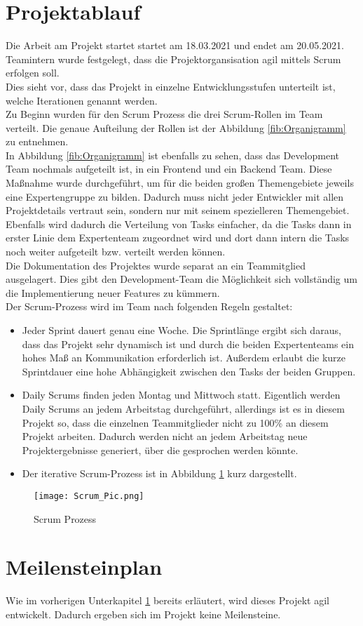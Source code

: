 \section{Projektablauf}
\label{sec:ablauf}
Die Arbeit am Projekt startet startet am 18.03.2021 und endet am 20.05.2021. \\
Teamintern wurde festgelegt, dass die Projektorgansisation agil mittels Scrum erfolgen soll.\\
Dies sieht vor, dass das Projekt in einzelne Entwicklungsstufen unterteilt ist, welche Iterationen genannt werden.\\
Zu Beginn wurden für den Scrum Prozess die drei Scrum-Rollen im Team verteilt. Die genaue Aufteilung der Rollen ist der Abbildung \ref{fib:Organigramm} zu entnehmen. \\
In Abbildung \ref{fib:Organigramm} ist ebenfalls zu sehen, dass das Development Team nochmals aufgeteilt ist, in ein Frontend und ein Backend Team. Diese Maßnahme wurde durchgeführt, um für die beiden großen Themengebiete jeweils eine Expertengruppe zu bilden. Dadurch muss nicht jeder Entwickler mit allen Projektdetails vertraut sein, sondern nur mit seinem spezielleren Themengebiet. Ebenfalls wird dadurch die Verteilung von Tasks einfacher, da die Tasks dann in erster Linie dem Expertenteam zugeordnet wird und dort dann intern die Tasks noch weiter aufgeteilt bzw. verteilt werden können. \\
Die Dokumentation des Projektes wurde separat an ein Teammitglied ausgelagert. Dies gibt den Development-Team die Möglichkeit sich vollständig um die Implementierung neuer Features zu kümmern.\\
Der Scrum-Prozess wird im Team nach folgenden Regeln gestaltet:
\begin{itemize}
\item Jeder Sprint dauert genau eine Woche. Die Sprintlänge ergibt sich daraus, dass das Projekt sehr dynamisch ist und durch die beiden Expertenteams ein hohes Maß an Kommunikation erforderlich ist. Außerdem erlaubt die kurze Sprintdauer eine hohe Abhängigkeit zwischen den Tasks der beiden Gruppen.
\item Daily Scrums finden jeden Montag und Mittwoch statt. Eigentlich werden Daily Scrums an jedem Arbeitstag durchgeführt, allerdings ist es in diesem Projekt so, dass die einzelnen Teammitglieder nicht zu 100\% an diesem Projekt arbeiten. Dadurch werden nicht an jedem Arbeitstag neue Projektergebnisse generiert, über die gesprochen werden könnte. 
\item Der iterative Scrum-Prozess ist in Abbildung \ref{fib:Scrum} kurz dargestellt.
\end{itemize} 

\begin{figure}[h]
\centering
\texttt{[image: Scrum\_Pic.png]}
\caption{Scrum Prozess}
\label{fib:Scrum}
\end{figure}

\section{Meilensteinplan}
Wie im vorherigen Unterkapitel \ref{sec:ablauf} bereits erläutert, wird dieses Projekt agil entwickelt. Dadurch ergeben sich im Projekt keine Meilensteine.